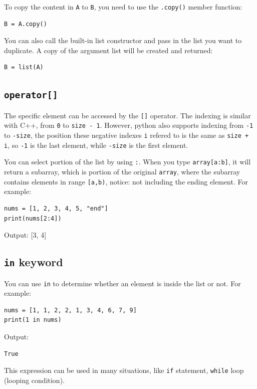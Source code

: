 \documentclass[12pt]{book}
\begin{document}
To copy the content in \texttt{A} to \texttt{B}, you need to use the \texttt{.copy()} member function:
\begin{verbatim}
B = A.copy()
\end{verbatim}

You can also call the built-in list constructor and pass in the list you want to duplicate. A copy of the argument list will be created and returned:
\begin{verbatim}
B = list(A)
\end{verbatim}

\subsection{\texttt{operator[]}}
\label{sec:orgd3e7963}
The specific element can be accessed by the \texttt{[]} operator. The indexing is similar with C++, from \texttt{0} to \texttt{size - 1}. However, python also supports indexing from \texttt{-1} to \texttt{-size}, the position these negative indexes \texttt{i} refered to is the same as \texttt{size + i}, so \texttt{-1} is the last element, while \texttt{-size} is the first element. 


You can select portion of the list by using \texttt{:}. When you type \texttt{array[a:b]}, it will return a subarray, which is portion of the original \texttt{array}, where the subarray contains elements in range \texttt{[a,b)}, notice: not including the ending element. For example:
\begin{verbatim}
nums = [1, 2, 3, 4, 5, "end"]
print(nums[2:4])
\end{verbatim}
Output:
[3, 4]
\subsection{\texttt{in} keyword}
\label{sec:org41a372d}
You can use \texttt{in} to determine whether an element is inside the list or not. For example:
\begin{verbatim}
nums = [1, 1, 2, 2, 1, 3, 4, 6, 7, 9]
print(1 in nums)
\end{verbatim}
Output:
\begin{verbatim}
True
\end{verbatim}

This expression can be used in many situations, like \texttt{if} statement, \texttt{while} loop (looping condition).
\end{document}
